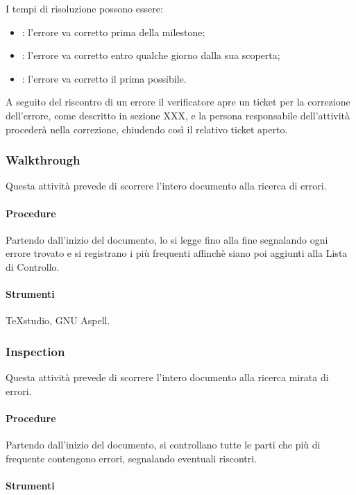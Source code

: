 I tempi di risoluzione possono essere:
\begin{itemize}
\item {}: l'errore va corretto prima della milestone;
\item {}: l'errore va corretto entro qualche giorno dalla sua scoperta;
\item {}: l'errore va corretto il prima possibile.
\end{itemize}

A seguito del riscontro di un errore il verificatore apre un ticket per la correzione dell'errore, come descritto in sezione XXX, e la persona responsabile dell'attività procederà nella correzione, chiudendo così il relativo ticket aperto.




\subsubsection{Walkthrough}
Questa attività prevede di scorrere l'intero documento alla ricerca di errori.
\paragraph{Procedure}

Partendo dall'inizio del documento, lo si legge fino alla fine segnalando ogni errore trovato e si registrano i più frequenti affinchè siano poi aggiunti alla Lista di Controllo.
\paragraph{Strumenti}

TeXstudio, GNU Aspell.

\subsubsection{Inspection}
Questa attività prevede di scorrere l'intero documento alla ricerca mirata di errori.
\paragraph{Procedure}

Partendo dall'inizio del documento, si controllano tutte le parti che più di frequente contengono errori, segnalando eventuali riscontri.
\paragraph{Strumenti}

